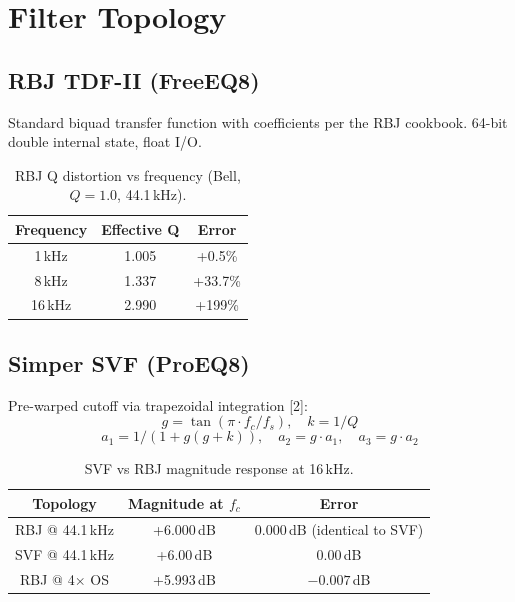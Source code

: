 \documentclass[twoside,a4paper]{article}
\begin{document}
\section{Filter Topology}
\subsection{RBJ TDF-II (FreeEQ8)}
Standard biquad transfer function with coefficients per the RBJ cookbook. 64-bit double internal state, float I/O.

\begin{table}[ht]
  \caption{RBJ Q distortion vs frequency (Bell, $Q=1.0$, 44.1\,kHz).}
  \centering
  \begin{tabular}{ccc}\toprule
    Frequency & Effective Q & Error \\\midrule
    1\,kHz & 1.005 & +0.5\% \\
    8\,kHz & 1.337 & +33.7\% \\
    16\,kHz & 2.990 & +199\% \\\bottomrule
  \end{tabular}
  \label{tab:qdistortion}
\end{table}

\subsection{Simper SVF (ProEQ8)}
Pre-warped cutoff via trapezoidal integration [2]:
\begin{equation}
g = \tan(\pi \cdot f_c / f_s), \quad k = 1/Q
\end{equation}
\begin{equation}
a_1 = 1 / (1 + g(g + k)), \quad a_2 = g \cdot a_1, \quad a_3 = g \cdot a_2
\end{equation}

\begin{table}[ht]
  \caption{SVF vs RBJ magnitude response at 16\,kHz.}
  \centering
  \begin{tabular}{ccc}\toprule
    Topology & Magnitude at $f_c$ & Error \\\midrule
    RBJ @ 44.1\,kHz & +6.000\,dB & $0.000$\,dB (identical to SVF) \\
    SVF @ 44.1\,kHz & +6.00\,dB & 0.00\,dB \\
    RBJ @ 4$\times$ OS & +5.993\,dB & $-0.007$\,dB \\\bottomrule
  \end{tabular}
  \label{tab:svfvsrbj}
\end{table}
\end{document}
